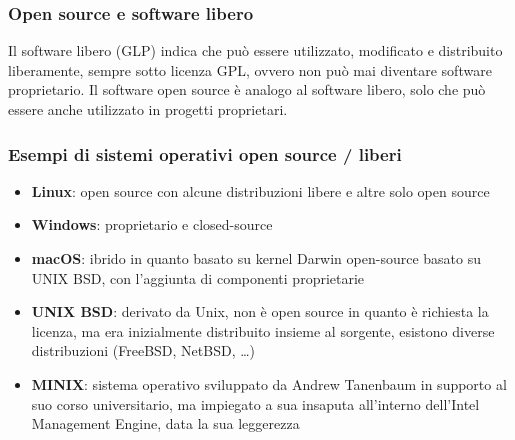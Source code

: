 \documentclass[a4paper]{article}
\begin{document}
\subsubsection*{Open source e software libero}
Il software libero (GLP) indica che può essere utilizzato, modificato e distribuito liberamente, sempre sotto licenza GPL, ovvero
non può mai diventare software proprietario. Il software open source è analogo al software libero, solo che può essere anche
utilizzato in progetti proprietari.

\subsubsection*{Esempi di sistemi operativi open source / liberi}
\begin{itemize}
	\item \textbf{Linux}: open source con alcune distribuzioni libere e altre solo open source
	\item \textbf{Windows}: proprietario e closed-source
	\item \textbf{macOS}: ibrido in quanto basato su kernel Darwin open-source basato su UNIX BSD, con l'aggiunta di componenti proprietarie
	\item \textbf{UNIX BSD}: derivato da Unix, non è open source in quanto è richiesta la licenza, ma era inizialmente distribuito
	insieme al sorgente, esistono diverse distribuzioni (FreeBSD, NetBSD, \dots)
	\item \textbf{MINIX}: sistema operativo sviluppato da Andrew Tanenbaum in supporto al suo corso universitario, ma impiegato
	a sua insaputa all'interno dell'Intel Management Engine, data la sua leggerezza
\end{itemize}

\newpage
\end{document}
